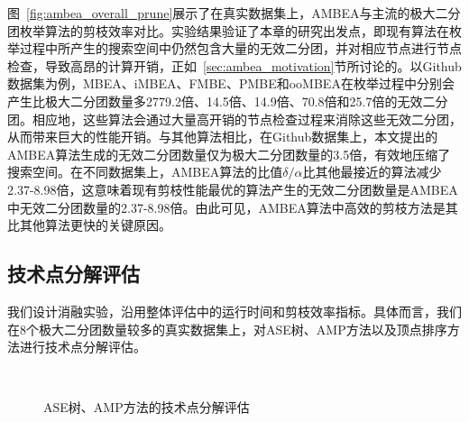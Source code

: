 图~\ref{fig:ambea_overall_prune}展示了在真实数据集上，AMBEA与主流的极大二分团枚举算法的剪枝效率对比。实验结果验证了本章的研究出发点，即现有算法在枚举过程中所产生的搜索空间中仍然包含大量的无效二分团，并对相应节点进行节点检查，导致高昂的计算开销，正如~\ref{sec:ambea_motivation}节所讨论的。以Github数据集为例，MBEA、iMBEA、FMBE、PMBE和ooMBEA在枚举过程中分别会产生比极大二分团数量多2779.2倍、14.5倍、14.9倍、70.8倍和25.7倍的无效二分团。相应地，这些算法会通过大量高开销的节点检查过程来消除这些无效二分团，从而带来巨大的性能开销。与其他算法相比，在Github数据集上，本文提出的AMBEA算法生成的无效二分团数量仅为极大二分团数量的3.5倍，有效地压缩了搜索空间。在不同数据集上，AMBEA算法的比值$\delta/\alpha$比其他最接近的算法减少2.37-8.98倍，这意味着现有剪枝性能最优的算法产生的无效二分团数量是AMBEA中无效二分团数量的2.37-8.98倍。由此可见，AMBEA算法中高效的剪枝方法是其比其他算法更快的关键原因。







\subsection{技术点分解评估}

我们设计消融实验，沿用整体评估中的运行时间和剪枝效率指标。具体而言，我们在8个极大二分团数量较多的真实数据集上，对ASE树、AMP方法以及顶点排序方法进行技术点分解评估。


\begin{figure} [t]
	\centering
  \vspace{0.05in}
  \\
  \vspace{0.05in}
	\caption{ASE树、AMP方法的技术点分解评估}
	\label{fig:ambea_opt}
\end{figure}


